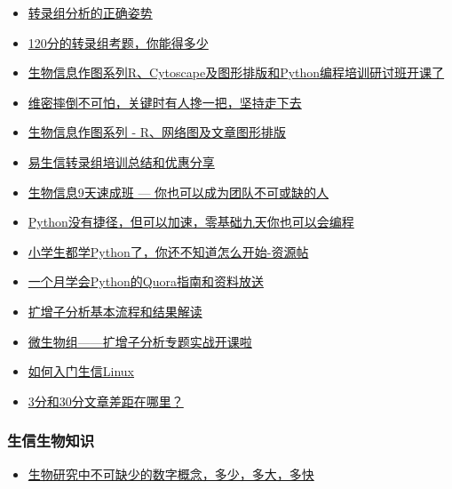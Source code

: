 \documentclass[]{article}
\providecommand{\tightlist}{%
  \setlength{\itemsep}{0pt}\setlength{\parskip}{0pt}}
\numberwithin{figure}{section}
\numberwithin{table}{section}
\begin{document}
\begin{itemize}
\tightlist
\item
  \href{http://mp.weixin.qq.com/s/Kx0gaU2x4pWjBq2I2Ffe6Q}{转录组分析的正确姿势}
\item
  \href{http://mp.weixin.qq.com/s/BmtIOcIzIutufFilbJIgEA}{120分的转录组考题，你能得多少}
\item
  \href{http://mp.weixin.qq.com/s/x-DInL34BbKUR-2UD2Ec3g}{生物信息作图系列R、Cytoscape及图形排版和Python编程培训研讨班开课了}
\item
  \href{http://mp.weixin.qq.com/s/4mWms-r5kg8kN7kJ60zZDQ}{维密摔倒不可怕，关键时有人搀一把，坚持走下去}
\item
  \href{http://mp.weixin.qq.com/s/IS3uVvulYsCbyuV64bcdLg}{生物信息作图系列 - R、网络图及文章图形排版}
\item
  \href{http://mp.weixin.qq.com/s/TLxzWyKImJhMINkNxLk6Yg}{易生信转录组培训总结和优惠分享}
\item
  \href{http://mp.weixin.qq.com/s/aRuaX-qXlHkF2vme9QqWag}{生物信息9天速成班 --- 你也可以成为团队不可或缺的人}
\item
  \href{http://mp.weixin.qq.com/s/vDAHTitasAUphWsrS2Uzlg}{Python没有捷径，但可以加速，零基础九天你也可以会编程}
\item
  \href{http://mp.weixin.qq.com/s/1JlAROpOCBwaG574EwvkVw}{小学生都学Python了，你还不知道怎么开始-资源帖}
\item
  \href{http://mp.weixin.qq.com/s/VTVVfpNSGgOJLNxeIqmFiw}{一个月学会Python的Quora指南和资料放送}
\item
  \href{http://mp.weixin.qq.com/s/cCW7HKjU8IetBgMoiYUeCQ}{扩增子分析基本流程和结果解读}
\item
  \href{http://mp.weixin.qq.com/s/y_KFJZlKSCJFmbuvNJQyAw}{微生物组------扩增子分析专题实战开课啦}
\item
  \href{http://mp.weixin.qq.com/s/V7vmnOv9rwKMoHtlPMo5nQ}{如何入门生信Linux}
\item
  \href{https://mp.weixin.qq.com/s/kD-x7K4hI5KMgGXikyLt0Q}{3分和30分文章差距在哪里？}
\end{itemize}

\hypertarget{ux751fux4fe1ux751fux7269ux77e5ux8bc6}{%
\subsubsection{生信生物知识}\label{ux751fux4fe1ux751fux7269ux77e5ux8bc6}}

\begin{itemize}
\tightlist
\item
  \href{http://mp.weixin.qq.com/s/JQBZv6snTkZzFwEG12riWw}{生物研究中不可缺少的数字概念，多少，多大，多快}
\end{itemize}
\end{document}
